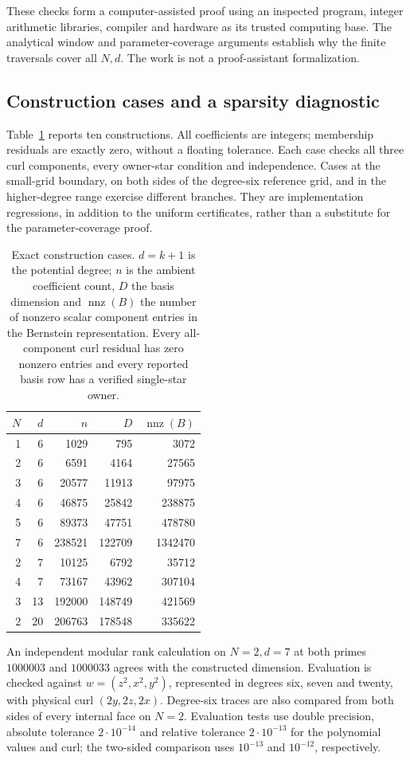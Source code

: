 \documentclass[11pt]{article}
\theoremstyle{remark}
\begin{document}
These checks form a computer-assisted proof using an inspected program,
integer arithmetic libraries, compiler and hardware as its trusted computing
base. The analytical window and parameter-coverage arguments establish
why the finite traversals cover all $N,d$. The work is not a proof-assistant
formalization.

\subsection{Construction cases and a sparsity diagnostic}

Table~\ref{tab:cases} reports ten constructions. All coefficients are
integers; membership residuals are exactly zero, without a floating
tolerance. Each case checks all three curl components, every owner-star
condition and independence. Cases at the small-grid boundary, on both
sides of the degree-six reference grid, and in the higher-degree range
exercise different branches. They are implementation regressions, in
addition to the uniform certificates, rather than a substitute for the
parameter-coverage proof.

\begin{table}[htbp]
\centering
\caption{Exact construction cases. $d=k+1$ is the potential degree;
$n$ is the ambient coefficient count, $D$ the basis dimension and
$\operatorname{nnz}(B)$ the number of nonzero scalar component entries in the Bernstein representation.
Every all-component curl residual has zero nonzero entries and every
reported basis row has a verified single-star owner.}
\label{tab:cases}
\begin{tabular}{rrrrr}
\toprule
$N$ & $d$ & $n$ & $D$ & $\operatorname{nnz}(B)$\\
\midrule
1&6&1029&795&3072\\
2&6&6591&4164&27565\\
3&6&20577&11913&97975\\
4&6&46875&25842&238875\\
5&6&89373&47751&478780\\
7&6&238521&122709&1342470\\
2&7&10125&6792&35712\\
4&7&73167&43962&307104\\
3&13&192000&148749&421569\\
2&20&206763&178548&335622\\
\bottomrule
\end{tabular}
\end{table}

An independent modular rank calculation on $N=2,d=7$ at both primes
$1000003$ and $1000033$ agrees with the constructed dimension. Evaluation
is checked against $w=(z^2,x^2,y^2)$, represented in degrees six, seven
and twenty, with physical curl $(2y,2z,2x)$. Degree-six traces are also
compared from both sides of every internal face on $N=2$. Evaluation
tests use double precision, absolute tolerance $2\cdot10^{-14}$ and
relative tolerance $2\cdot10^{-13}$ for the polynomial values and curl;
the two-sided comparison uses $10^{-13}$ and $10^{-12}$, respectively.
\end{document}
